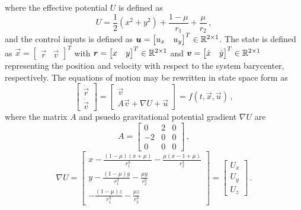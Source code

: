 \documentclass[preprint]{elsarticle}
\begin{document}
where the effective potential \( U\) is defined as
\begin{equation}
	U = \frac{1}{2} \left( x^2 + y^2\right) + \frac{1-\mu}{r_1} + \frac{\mu}{r_2}\, ,
	\label{eq:eff_pot}
\end{equation}
and the control inputs is defined as \( \boldsymbol{u} = \begin{bmatrix} u_x & u_y \end{bmatrix}^T \in \mathbb{R}^{2\times1} \).
The state is defined as \( \vec{x} = \begin{bmatrix}\vec{r} &\vec{v} \end{bmatrix}^T\) with \(\boldsymbol{r} = \begin{bmatrix} x & y \end{bmatrix}^T \in \mathbb{R}^{2\times1}\) and \(\boldsymbol{v}= \begin{bmatrix} \dot{x} & \dot{y} \end{bmatrix}^T \in \mathbb{R}^{2\times1}\) representing the position and velocity with respect to the system barycenter, respectively.
The equations of motion may be rewritten in state space form as
\begin{equation}\label{eqn:cont_dyn}
	\left[\begin{array}{c} \dot{\vec{r}} \\ \dot{\vec{v}} \end{array} \right] = 
	\left[ \begin{array}{c} \vec{v} \\ A \vec{v} + \nabla U + \vec{u} \end{array} \right] = f\left( t,\vec{x}, \vec{u}\right) \, ,
\end{equation}
where the matrix \( A \) and psuedo gravitational potential gradient \( \nabla U\) are
\begin{equation}\label{eq:A_mat}
	A = \left[ \begin{array}{ccc} 0 & 2 & 0 \\ -2 & 0 & 0 \\ 0 & 0 & 0 \end{array} \right] \, ,
\end{equation}
\begin{equation} \label{eq:grav_pot}
	\nabla U = \left[ \begin{array}{c} x - \frac{ \left(1 - \mu\right) \left(x + \mu\right)}{r_1^3} - \frac{\mu \left( x - 1 + \mu \right)}{r_2^3} \\
											y - \frac{ \left(1 - \mu\right) y}{r_1^3} - \frac{\mu y}{r_2^3} \\
											- \frac{ \left(1 - \mu\right) z}{r_1^3} - \frac{\mu z}{r_2^3}\end{array}\right]
					= \left[\begin{array}{c} U_x \\ U_y \\ U_z\end{array} \right] \, .
\end{equation}
\end{document}
